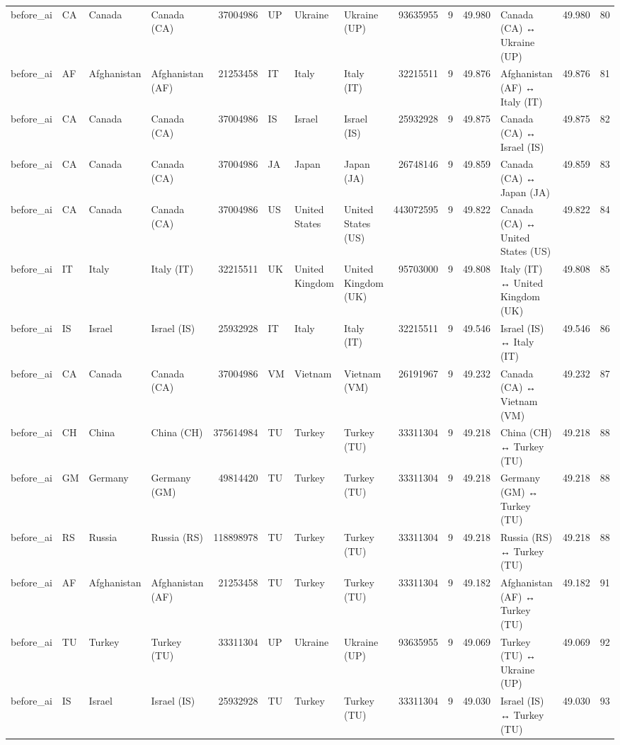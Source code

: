 \begin{tabular}{llllrlllrrrlrr}
before\_ai & CA & Canada & Canada (CA) & 37004986 & UP & Ukraine & Ukraine (UP) & 93635955 & 9 & 49.980 & Canada (CA) ↔ Ukraine (UP) & 49.980 & 80 \\
before\_ai & AF & Afghanistan & Afghanistan (AF) & 21253458 & IT & Italy & Italy (IT) & 32215511 & 9 & 49.876 & Afghanistan (AF) ↔ Italy (IT) & 49.876 & 81 \\
before\_ai & CA & Canada & Canada (CA) & 37004986 & IS & Israel & Israel (IS) & 25932928 & 9 & 49.875 & Canada (CA) ↔ Israel (IS) & 49.875 & 82 \\
before\_ai & CA & Canada & Canada (CA) & 37004986 & JA & Japan & Japan (JA) & 26748146 & 9 & 49.859 & Canada (CA) ↔ Japan (JA) & 49.859 & 83 \\
before\_ai & CA & Canada & Canada (CA) & 37004986 & US & United States & United States (US) & 443072595 & 9 & 49.822 & Canada (CA) ↔ United States (US) & 49.822 & 84 \\
before\_ai & IT & Italy & Italy (IT) & 32215511 & UK & United Kingdom & United Kingdom (UK) & 95703000 & 9 & 49.808 & Italy (IT) ↔ United Kingdom (UK) & 49.808 & 85 \\
before\_ai & IS & Israel & Israel (IS) & 25932928 & IT & Italy & Italy (IT) & 32215511 & 9 & 49.546 & Israel (IS) ↔ Italy (IT) & 49.546 & 86 \\
before\_ai & CA & Canada & Canada (CA) & 37004986 & VM & Vietnam & Vietnam (VM) & 26191967 & 9 & 49.232 & Canada (CA) ↔ Vietnam (VM) & 49.232 & 87 \\
before\_ai & CH & China & China (CH) & 375614984 & TU & Turkey & Turkey (TU) & 33311304 & 9 & 49.218 & China (CH) ↔ Turkey (TU) & 49.218 & 88 \\
before\_ai & GM & Germany & Germany (GM) & 49814420 & TU & Turkey & Turkey (TU) & 33311304 & 9 & 49.218 & Germany (GM) ↔ Turkey (TU) & 49.218 & 88 \\
before\_ai & RS & Russia & Russia (RS) & 118898978 & TU & Turkey & Turkey (TU) & 33311304 & 9 & 49.218 & Russia (RS) ↔ Turkey (TU) & 49.218 & 88 \\
before\_ai & AF & Afghanistan & Afghanistan (AF) & 21253458 & TU & Turkey & Turkey (TU) & 33311304 & 9 & 49.182 & Afghanistan (AF) ↔ Turkey (TU) & 49.182 & 91 \\
before\_ai & TU & Turkey & Turkey (TU) & 33311304 & UP & Ukraine & Ukraine (UP) & 93635955 & 9 & 49.069 & Turkey (TU) ↔ Ukraine (UP) & 49.069 & 92 \\
before\_ai & IS & Israel & Israel (IS) & 25932928 & TU & Turkey & Turkey (TU) & 33311304 & 9 & 49.030 & Israel (IS) ↔ Turkey (TU) & 49.030 & 93 \\

\end{tabular}
